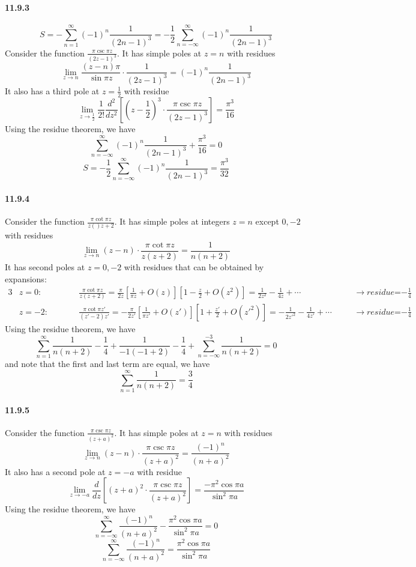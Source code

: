 \documentclass[a4paper]{article}
\begin{document}
\paragraph{11.9.3}
\[
S=-\sum_{n=1}^\infty(-1)^n\frac{1}{(2n-1)^3}=-\frac{1}{2}\sum_{n=-\infty}^\infty(-1)^n\frac{1}{(2n-1)^3}
\]
Consider the function $\frac{\pi\csc\pi z}{(2z-1)^3}$. It has simple poles at $z=n$ with residues
\[
\lim_{z\to n}\frac{(z-n)\pi}{\sin\pi z}\cdot\frac{1}{(2z-1)^3}=(-1)^n\frac{1}{(2n-1)^3}
\]
It also has a third pole at $z=\frac{1}{2}$ with residue
\[
\lim_{z\to\frac{1}{2}}\frac{1}{2!}\frac{d^2}{dz^2}\left[(z-\frac{1}{2})^3\cdot\frac{\pi\csc\pi z}{(2z-1)^3} \right]=\frac{\pi^3}{16}
\]
Using the residue theorem, we have
\[
\sum_{n=-\infty}^\infty(-1)^n\frac{1}{(2n-1)^3}+\frac{\pi^3}{16}=0
\]
\[
S=-\frac{1}{2}\sum_{n=-\infty}^\infty(-1)^n\frac{1}{(2n-1)^3}=\frac{\pi^3}{32}
\]

\paragraph{11.9.4}
Consider the function $\frac{\pi\cot\pi z}{z()z+2}$. It has simple poles at integers $z=n$ except $0,-2$ with residues
\[
\lim_{z\to n}(z-n)\cdot\frac{\pi\cot\pi z}{z(z+2)}=\frac{1}{n(n+2)}
\]
It has second poles at $z=0,-2$ with residues that can be obtained by expansions:
\begin{alignat*}{3}
    & z=0:\qquad && \frac{\pi\cot\pi z}{z(z+2)}=\frac{\pi}{2z}\left[\frac{1}{\pi z}+O(z) \right]\left[1-\frac{z}{2}+O(z^2) \right]=\frac{1}{2z^2}-\frac{1}{4z}+\cdots\quad &&\rightarrow \textit{residue=$-\frac{1}{4}$}\\
    & z=-2:\qquad && \frac{\pi\cot\pi z'}{(z'-2)z'}=-\frac{\pi}{2z'}\left[\frac{1}{\pi z'}+O(z') \right]\left[1+\frac{z'}{2}+O(z'^2) \right]=-\frac{1}{2z'^2}-\frac{1}{4z'}+\cdots\quad &&\rightarrow \textit{residue=$-\frac{1}{4}$}
\end{alignat*}
Using the residue theorem, we have
\[
\sum_{n=1}^\infty\frac{1}{n(n+2)}-\frac{1}{4}+\frac{1}{-1(-1+2)}-\frac{1}{4}+\sum_{n=-\infty}^{-3}\frac{1}{n(n+2)}=0
\]
and note that the first and last term are equal, we have
\[
\sum_{n=1}^\infty\frac{1}{n(n+2)}=\frac{3}{4}
\]

\paragraph{11.9.5}
Consider the function $\frac{\pi\csc\pi z}{(z+a)^2}$. It has simple poles at $z=n$ with residues
\[
\lim_{z\to n}(z-n)\cdot\frac{\pi\csc\pi z}{(z+a)^2}=\frac{(-1)^n}{(n+a)^2}
\]
It also has a second pole at $z=-a$ with residue
\[
\lim_{z\to-a}\frac{d}{dz}\left[(z+a)^2\cdot\frac{\pi\csc\pi z}{(z+a)^2} \right]=\frac{-\pi^2\cos\pi a}{\sin^2\pi a}
\]
Using the residue theorem, we have
\[
\sum_{n=-\infty}^\infty\frac{(-1)^n}{(n+a)^2}-\frac{\pi^2\cos\pi a}{\sin^2\pi a}=0
\]
\[
\sum_{n=-\infty}^\infty\frac{(-1)^n}{(n+a)^2}=\frac{\pi^2\cos\pi a}{\sin^2\pi a}
\]
\end{document}
